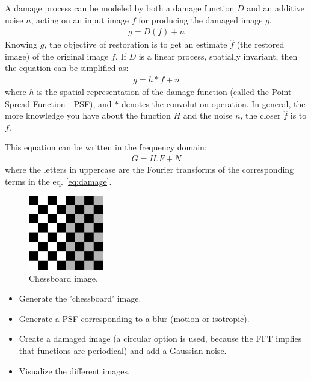A damage process can be modeled by both a damage function $D$ and an additive noise $n$, acting on an input image $f$ for producing the damaged image $g$.
\begin{eqnarray}
g=D(f)+n
\end{eqnarray}
Knowing $g$, the objective of restoration is to get an estimate $\hat{f}$ (the restored image) of the original image $f$. If $D$ is a linear process, spatially invariant, then the equation can be simplified as:
\begin{eqnarray}
g=h*f+n \label{eq:damage}
\end{eqnarray}
where $h$ is the spatial representation of the damage function (called the Point Spread Function - PSF), and $*$ denotes the convolution operation.
In general, the more knowledge you have about the function $H$ and the noise $n$, the closer $\hat{f}$ is to $f$.

This equation can be written in the frequency domain:
\begin{eqnarray}
G=H.F+N
\end{eqnarray}
where the letters in uppercase are the Fourier transforms of the corresponding terms in the eq. \ref{eq:damage}.

	\begin{figure}[htbp]
	 \centering\caption{Chessboard image.}%
	\includegraphics[height=3.25cm]{chessboard}%
	\end{figure}
	
\begin{qbox}
\begin{itemize}
	\item Generate the 'chessboard' image.
	\item Generate a PSF corresponding to a blur (motion or isotropic).
	\item Create a damaged image (a circular option is used, because the FFT implies that functions are periodical) and add a Gaussian noise.
	\item Visualize the different images. 
\end{itemize}
\end{qbox}

